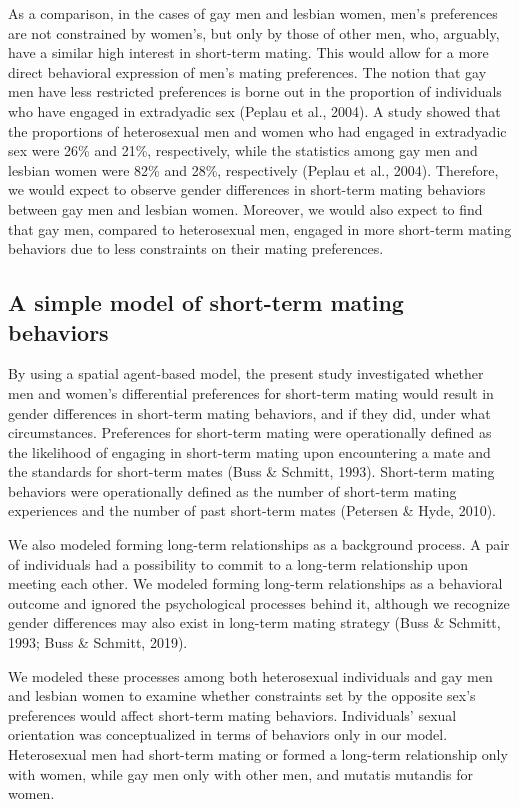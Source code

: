 \documentclass[
  11pt,
]{article}
\begin{document}
As a comparison, in the cases of gay men and lesbian women, men's
preferences are not constrained by women's, but only by those of other
men, who, arguably, have a similar high interest in short-term mating.
This would allow for a more direct behavioral expression of men's mating
preferences. The notion that gay men have less restricted preferences is
borne out in the proportion of individuals who have engaged in
extradyadic sex (Peplau et al., 2004). A study showed that the
proportions of heterosexual men and women who had engaged in extradyadic
sex were 26\% and 21\%, respectively, while the statistics among gay men
and lesbian women were 82\% and 28\%, respectively (Peplau et al.,
2004). Therefore, we would expect to observe gender differences in
short-term mating behaviors between gay men and lesbian women. Moreover,
we would also expect to find that gay men, compared to heterosexual men,
engaged in more short-term mating behaviors due to less constraints on
their mating preferences.

\hypertarget{a-simple-model-of-short-term-mating-behaviors}{%
\subsection{A simple model of short-term mating
behaviors}\label{a-simple-model-of-short-term-mating-behaviors}}

By using a spatial agent-based model, the present study investigated
whether men and women's differential preferences for short-term mating
would result in gender differences in short-term mating behaviors, and
if they did, under what circumstances. Preferences for short-term mating
were operationally defined as the likelihood of engaging in short-term
mating upon encountering a mate and the standards for short-term mates
(Buss \& Schmitt, 1993). Short-term mating behaviors were operationally
defined as the number of short-term mating experiences and the number of
past short-term mates (Petersen \& Hyde, 2010).

We also modeled forming long-term relationships as a background process.
A pair of individuals had a possibility to commit to a long-term
relationship upon meeting each other. We modeled forming long-term
relationships as a behavioral outcome and ignored the psychological
processes behind it, although we recognize gender differences may also
exist in long-term mating strategy (Buss \& Schmitt, 1993; Buss \&
Schmitt, 2019).

We modeled these processes among both heterosexual individuals and gay
men and lesbian women to examine whether constraints set by the opposite
sex's preferences would affect short-term mating behaviors. Individuals'
sexual orientation was conceptualized in terms of behaviors only in our
model. Heterosexual men had short-term mating or formed a long-term
relationship only with women, while gay men only with other men, and
mutatis mutandis for women.
\end{document}
